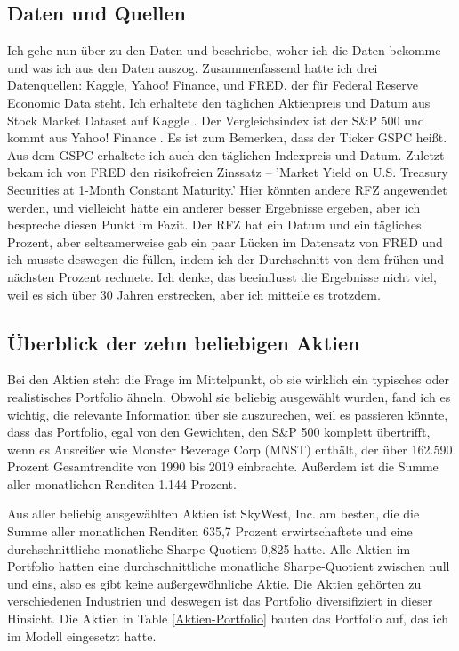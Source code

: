\documentclass[12pt]{article}
\begin{document}
        \subsection{Daten und Quellen}
    
            Ich gehe nun über zu den Daten und beschriebe, woher ich die Daten bekomme und was ich aus den Daten auszog. 
            Zusammenfassend hatte ich drei Datenquellen: Kaggle, Yahoo! Finance, und FRED, der für Federal Reserve Economic Data steht. 
            Ich erhaltete den täglichen Aktienpreis und Datum aus Stock Market Dataset auf Kaggle \cite{onyshchak}.
            Der Vergleichsindex ist der S\&P 500 und kommt aus Yahoo! Finance \cite{yahoo}. 
            Es ist zum Bemerken, dass der Ticker GSPC heißt. Aus dem GSPC erhaltete ich auch den täglichen Indexpreis und Datum. 
            Zuletzt bekam ich von FRED \cite{fred} den risikofreien Zinssatz -- 'Market Yield on U.S. Treasury Securities at  
            1-Month Constant Maturity.' Hier könnten andere RFZ angewendet werden,
            und vielleicht hätte ein anderer besser Ergebnisse ergeben, aber ich bespreche diesen Punkt im Fazit.
            Der RFZ hat ein Datum und ein tägliches Prozent, aber seltsamerweise gab ein paar Lücken im Datensatz von FRED und 
            ich musste deswegen die füllen, indem ich der Durchschnitt von dem frühen und nächsten Prozent rechnete. 
            Ich denke, das beeinflusst die Ergebnisse nicht viel, weil es sich über 30 Jahren erstrecken, 
            aber ich mitteile es trotzdem.
            
        \subsection{Überblick der zehn beliebigen Aktien}
    
            Bei den Aktien steht die Frage im Mittelpunkt, ob sie wirklich ein typisches oder realistisches Portfolio ähneln. 
            Obwohl sie beliebig ausgewählt wurden, fand ich es wichtig, 
            die relevante Information über sie auszurechen, weil es passieren könnte, dass das Portfolio, 
            egal von den Gewichten, den S\&P 500 komplett übertrifft, wenn es Ausreißer wie Monster Beverage Corp (MNST) enthält, 
            der über 162.590 Prozent Gesamtrendite von 1990 bis 2019 einbrachte. Außerdem ist die Summe aller monatlichen Renditen 1.144 Prozent.

            
            Aus aller beliebig ausgewählten Aktien ist SkyWest, Inc. am besten, 
            die die Summe aller monatlichen Renditen 635,7 Prozent erwirtschaftete und
            eine durchschnittliche monatliche Sharpe-Quotient 0,825 hatte.
            Alle Aktien im Portfolio hatten eine durchschnittliche monatliche Sharpe-Quotient zwischen null und eins,
            also es gibt keine außergewöhnliche Aktie. Die Aktien gehörten zu verschiedenen Industrien und
            deswegen ist das Portfolio diversifiziert in dieser Hinsicht. Die Aktien in Table \ref{Aktien-Portfolio} bauten das Portfolio auf,
            das ich im Modell eingesetzt hatte.
            
\end{document}
